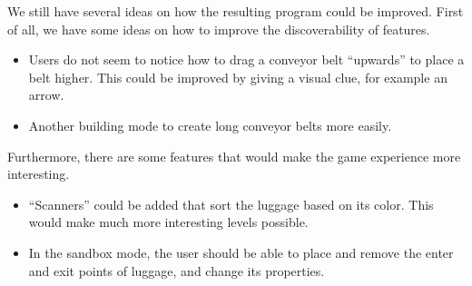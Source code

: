 We still have several ideas on how the resulting program could be improved. First of all, we have some ideas on how to improve the discoverability of features.
\begin{itemize}
 \item Users do not seem to notice how to drag a conveyor belt ``upwards'' to place a belt higher. This could be improved by giving a visual clue, for example an arrow.
 \item Another building mode to create long conveyor belts more easily.
\end{itemize}

Furthermore, there are some features that would make the game experience more interesting.
\begin{itemize}
 \item ``Scanners'' could be added that sort the luggage based on its color. This would make much more interesting levels possible.
 \item In the sandbox mode, the user should be able to place and remove the enter and exit points of luggage, and change its properties.
\end{itemize}
